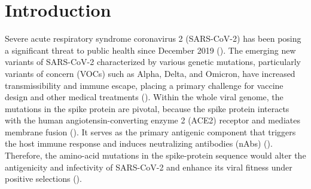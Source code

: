 \documentclass{sysbio}%
\begin{document}

\maketitle

\section{Introduction}


Severe acute respiratory syndrome coronavirus 2 (SARS-CoV-2) has been posing a significant threat to public health since December 2019  (\cite{SARS-CoV-2-outbreak,new_coronavirus}). The emerging new variants of SARS-CoV-2 characterized by various genetic mutations, particularly variants of concern (VOCs) such as Alpha, Delta, and Omicron, have increased transmissibility and immune escape, placing a primary challenge for vaccine design and other medical treatments  (\cite{alpha_mu,delta_neuta,omi_alert,antibody,antibody2,small_molecu_d,small_molecu_d_2,vaccine,vaccine2}). Within the whole viral genome, the mutations in the spike protein are pivotal, because the spike protein interacts with the human angiotensin-converting enzyme 2 (ACE2) receptor and mediates membrane fusion (\cite{spike_entry_fav,spike_entry2,spike_entry}). 
It serves as the primary antigenic component that triggers the host immune response and induces neutralizing antibodies (nAbs) (\cite{spike_imp,spike_primary_tar,spike_imp,spike_antigencity}). Therefore, the amino-acid mutations in the spike-protein sequence would alter the antigenicity and infectivity of SARS-CoV-2 and enhance its viral fitness under positive selections  (\cite{sars_variant,DMS_antibody,DMS_binding_affinity,JianLu2023MBE}).
\end{document}
